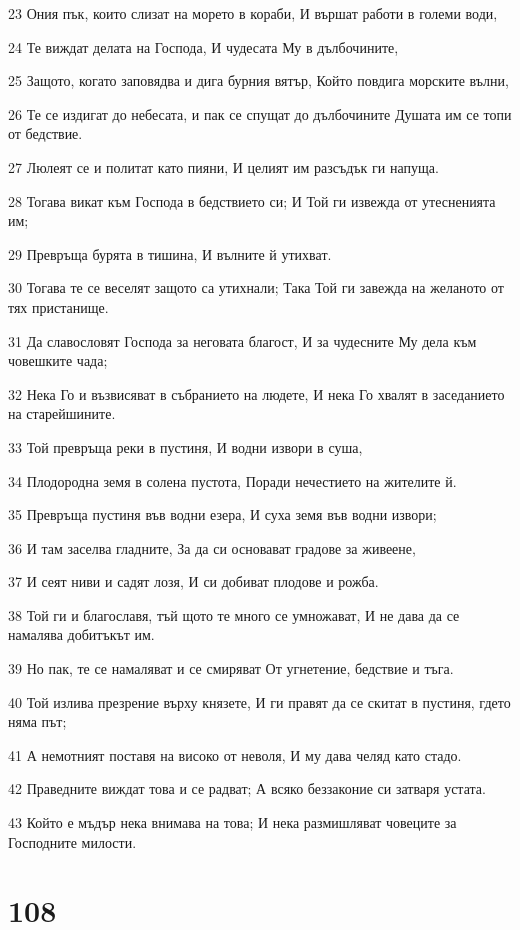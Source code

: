\par 23 Ония пък, които слизат на морето в кораби, И вършат работи в големи води,
\par 24 Те виждат делата на Господа, И чудесата Му в дълбочините,
\par 25 Защото, когато заповядва и дига бурния вятър, Който повдига морските вълни,
\par 26 Те се издигат до небесата, и пак се спущат до дълбочините Душата им се топи от бедствие.
\par 27 Люлеят се и политат като пияни, И целият им разсъдък ги напуща.
\par 28 Тогава викат към Господа в бедствието си; И Той ги извежда от утесненията им;
\par 29 Превръща бурята в тишина, И вълните й утихват.
\par 30 Тогава те се веселят защото са утихнали; Така Той ги завежда на желаното от тях пристанище.
\par 31 Да славословят Господа за неговата благост, И за чудесните Му дела към човешките чада;
\par 32 Нека Го и възвисяват в събранието на людете, И нека Го хвалят в заседанието на старейшините.
\par 33 Той превръща реки в пустиня, И водни извори в суша,
\par 34 Плодородна земя в солена пустота, Поради нечестието на жителите й.
\par 35 Превръща пустиня във водни езера, И суха земя във водни извори;
\par 36 И там заселва гладните, За да си основават градове за живеене,
\par 37 И сеят ниви и садят лозя, И си добиват плодове и рожба.
\par 38 Той ги и благославя, тъй щото те много се умножават, И не дава да се намалява добитъкът им.
\par 39 Но пак, те се намаляват и се смиряват От угнетение, бедствие и тъга.
\par 40 Той излива презрение върху князете, И ги правят да се скитат в пустиня, гдето няма път;
\par 41 А немотният поставя на високо от неволя, И му дава челяд като стадо.
\par 42 Праведните виждат това и се радват; А всяко беззаконие си затваря устата.
\par 43 Който е мъдър нека внимава на това; И нека размишляват човеците за Господните милости.

\chapter{108}

